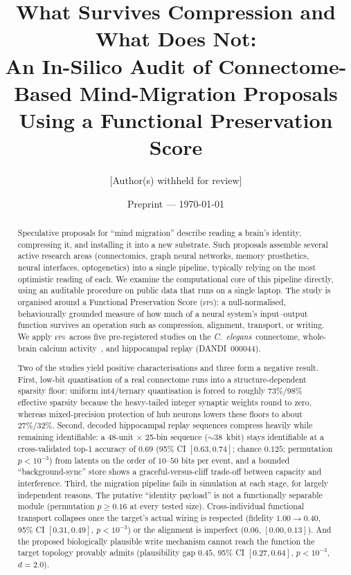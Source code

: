 \documentclass[11pt]{article}
\title{\textbf{What Survives Compression and What Does Not:\\
An In-Silico Audit of Connectome-Based Mind-Migration Proposals\\
Using a Functional Preservation Score}}
\author{[Author(s) withheld for review]}
\date{Preprint --- \today}
\newcommand{\fps}{\textsc{fps}}
\newcommand{\celegans}{\textit{C.\ elegans}}
\begin{document}
\maketitle

\begin{abstract}
\noindent
Speculative proposals for ``mind migration'' describe reading a brain's identity, compressing it,
and installing it into a new substrate. Such proposals assemble several active research areas
(connectomics, graph neural networks, memory prosthetics, neural interfaces, optogenetics) into a
single pipeline, typically relying on the most optimistic reading of each. We examine the
computational core of this pipeline directly, using an auditable procedure on public data that
runs on a single laptop. The study is organised around a Functional Preservation Score (\fps):
a null-normalised, behaviourally grounded measure of how much of a neural system's input--output
function survives an operation such as compression, alignment, transport, or writing. We apply
\fps\ across five pre-registered studies on the \celegans\ connectome, whole-brain calcium
activity~\citep{kato2015global}, and hippocampal replay (DANDI~000044).

Two of the studies yield positive characterisations and three form a negative result. First,
low-bit quantisation of a real connectome runs into a structure-dependent sparsity floor: uniform
int4/ternary quantisation is forced to roughly $73\%/98\%$ effective sparsity because the
heavy-tailed integer synaptic weights round to zero, whereas mixed-precision protection of hub
neurons lowers these floors to about $27\%/32\%$. Second, decoded hippocampal replay sequences
compress heavily while remaining identifiable: a 48-unit $\times$ 25-bin sequence ($\sim$38~kbit)
stays identifiable at a cross-validated top-1 accuracy of $0.69$ (95\% CI $[0.63,0.74]$; chance
$0.125$; permutation $p<10^{-3}$) from latents on the order of $10$--$50$ bits per event, and a
bounded ``background-sync'' store shows a graceful-versus-cliff trade-off between capacity and
interference. Third, the migration pipeline fails in simulation at each stage, for largely
independent reasons. The putative ``identity payload'' is not a functionally separable module
(permutation $p\geq0.16$ at every tested size). Cross-individual functional transport collapses
once the target's actual wiring is respected (fidelity $1.00\!\to\!0.40$, 95\% CI $[0.31,0.49]$,
$p<10^{-3}$) or the alignment is imperfect ($0.06$, $[0.00,0.13]$). And the proposed biologically
plausible write mechanism cannot reach the function the target topology provably admits
(plausibility gap $0.45$, 95\% CI $[0.27,0.64]$, $p<10^{-3}$, $d=2.0$).


\end{abstract}
\end{document}
